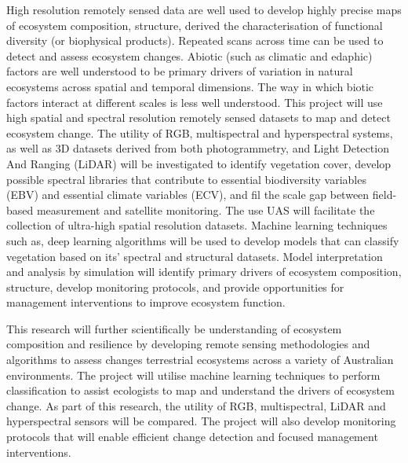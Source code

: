 High resolution remotely sensed data are well used to develop highly precise maps of ecosystem composition, 
structure, derived the characterisation of functional diversity (or biophysical products). Repeated scans 
across time can be used to detect and assess ecosystem changes. Abiotic (such as climatic and edaphic) 
factors are well understood to be primary drivers of variation in natural ecosystems across spatial and 
temporal dimensions. The way in which biotic factors interact at different scales is less well understood. 
This project will use high spatial and spectral resolution remotely sensed datasets to map and detect 
ecosystem change. The utility of RGB, multispectral and hyperspectral systems, as well as 3D datasets 
derived from both photogrammetry, and Light Detection And Ranging (LiDAR) will be investigated to identify 
vegetation cover, develop possible spectral libraries that contribute to essential biodiversity variables 
(EBV) and essential climate variables (ECV), and fil the scale gap between field-based measurement and 
satellite monitoring. The use UAS will facilitate the collection of ultra-high spatial resolution datasets. 
Machine learning techniques such as, deep learning algorithms will be used to develop models that can 
classify vegetation based on its’ spectral and structural datasets. Model interpretation and analysis by 
simulation will identify primary drivers of ecosystem composition, structure, develop monitoring protocols, 
and provide opportunities for management interventions to improve ecosystem function.

This research will further scientifically be understanding of ecosystem composition and resilience by 
developing remote sensing methodologies and algorithms to assess changes terrestrial ecosystems across a 
variety of Australian environments. The project will utilise machine learning techniques to perform 
classification to assist ecologists to map and understand the drivers of ecosystem change. As part of this 
research, the utility of RGB, multispectral, LiDAR and hyperspectral sensors will be compared. The project
will also develop monitoring protocols that will enable efficient change detection
and focused management interventions.

